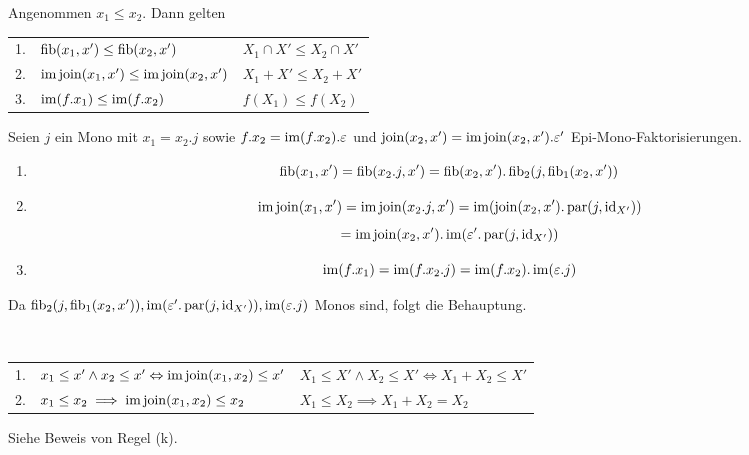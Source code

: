 \begin{lemm}[Regel (i)]
Angenommen $x_1 \leq x_2$. Dann gelten

\begin{tabular}{rll}
   1.
&  $\operatorname{fib}(x_1,x') \leq \operatorname{fib}(x_2,x')$
&  $X_1 \cap X' \leq X_2 \cap X'$
\\ 2.
&  $\operatorname{im}\operatorname{join}(x_1,x') \leq \operatorname{im}\operatorname{join}(x_2,x')$
&  $X_1 + X' \leq X_2 + X'$
\\ 3.
&  $\operatorname{im}(f.x_1) \leq \operatorname{im}(f.x_2)$
&  $f(X_1) \leq f(X_2)$
\end{tabular}
\end{lemm}
\begin{bew}
Seien $j$ ein Mono mit $x_1 = x_2.j$ sowie
$f.x_2 = \operatorname{im}(f.x_2).\varepsilon$ und
$\operatorname{join}(x_2,x') = \operatorname{im}\operatorname{join}(x_2,x').\varepsilon'$ Epi-Mono-Faktorisierungen.

\begin{enumerate}
\item
\[ \operatorname{fib}(x_1,x') = \operatorname{fib}(x_2.j,x')
= \operatorname{fib}(x_2,x').\operatorname{fib}_2(j,\operatorname{fib}_1(x_2,x'))
\]
\item
\[ \operatorname{im}\operatorname{join}(x_1,x')
= \operatorname{im}\operatorname{join}(x_2.j,x')
= \operatorname{im}(\operatorname{join}(x_2,x').\operatorname{par}(j,\operatorname{id}_{X'}))
\]\[
= \operatorname{im}\operatorname{join}(x_2,x').\operatorname{im}(\varepsilon'.\operatorname{par}(j,\operatorname{id}_{X'}))
\]
\item
\[ \operatorname{im}(f.x_1) = \operatorname{im}(f.x_2.j) = \operatorname{im}(f.x_2).\operatorname{im}(\varepsilon.j) \]
\end{enumerate}

Da $\operatorname{fib}_2(j,\operatorname{fib}_1(x_2,x')), \operatorname{im}(\varepsilon'.\operatorname{par}(j,\operatorname{id}_{X'})), \operatorname{im}(\varepsilon.j)$ Monos sind, folgt die Behauptung.

\end{bew}

\begin{lemm}[Regel (j)]
\ \linebreak

\begin{tabular}{rll}
   1.
&  $x_1 \leq x' \wedge x_2 \leq x' \Leftrightarrow \operatorname{im}\operatorname{join}(x_1,x_2)\leq x'$
&  $X_1 \leq X' \wedge X_2 \leq X' \Leftrightarrow X_1 + X_2 \leq X'$
\\ 2.
&  $x_1\leq x_2 \implies \operatorname{im}\operatorname{join}(x_1,x_2)\leq x_2$
&  $X_1 \leq X_2 \implies X_1 + X_2 = X_2$
\end{tabular}
\end{lemm}
\begin{bew}
Siehe Beweis von Regel (k).
\end{bew}

